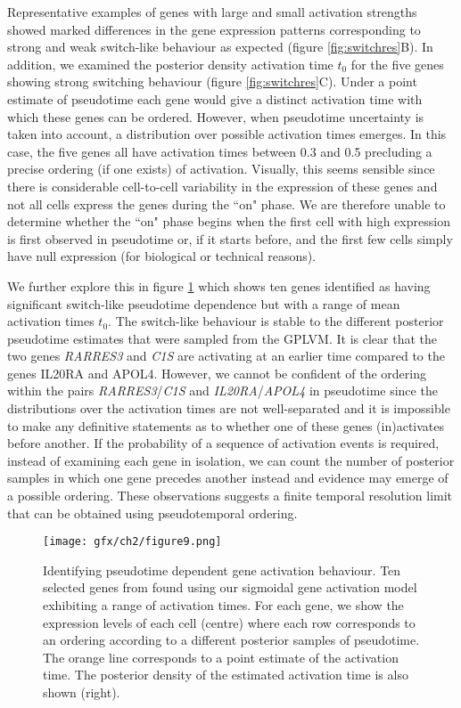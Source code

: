 Representative examples of genes with large and small activation strengths showed marked differences in the gene expression patterns corresponding  to strong and weak switch-like behaviour as expected (figure \ref{fig:switchres}B). In addition, we examined the posterior density activation time $t_0$ for the five genes showing strong switching behaviour (figure \ref{fig:switchres}C). Under a point estimate of pseudotime each gene would give a distinct activation time with which these genes can be ordered. However, when pseudotime uncertainty is taken into account, a distribution over possible activation times emerges. In this case, the five genes all have activation times between 0.3 and 0.5 precluding a precise ordering (if one exists) of activation. Visually, this seems sensible since there is considerable cell-to-cell variability in the expression of these genes and not all cells express the genes during the ``on" phase. We are therefore unable to determine whether the ``on" phase begins when the first cell with high expression is first observed in pseudotime or, if it starts before, and the first few cells simply have null expression (for biological or technical reasons).

We further explore this in figure \ref{fig:switchres2} which shows ten genes identified as having significant switch-like pseudotime dependence but with a range of mean activation times $t_0$. The switch-like behaviour is stable to the different posterior pseudotime estimates that were sampled from the GPLVM. It is clear that the two genes \emph{RARRES3} and \emph{C1S} are activating at an earlier time compared to the genes IL20RA and APOL4. However, we cannot be confident of the ordering within the pairs \emph{RARRES3}/\emph{C1S} and \emph{IL20RA}/\emph{APOL4} in pseudotime since the distributions over the activation times are not well-separated and it is impossible to make any definitive statements as to whether one of these genes (in)activates before another. If the probability of a sequence of activation events is required, instead of examining each gene in isolation, we can count the number of posterior samples in which one gene precedes another instead and evidence may emerge of a possible ordering. These observations suggests a finite temporal resolution limit that can be obtained using pseudotemporal ordering.

\begin{figure}%
\centering
	\texttt{[image: gfx/ch2/figure9.png]}
\caption[Identifying pseudotime dependent gene activation behaviour.]{ Identifying pseudotime dependent gene activation behaviour. Ten selected genes from \cite{Trapnell2014-xi} found using our  sigmoidal gene activation model exhibiting a range of activation times. For each gene, we show the expression levels of each cell (centre) where each row corresponds to an ordering according to a different posterior samples of pseudotime. The orange line corresponds to a point estimate of the activation time. The posterior density of the estimated activation time is also shown (right).
} \label{fig:switchres2}
\end{figure}

